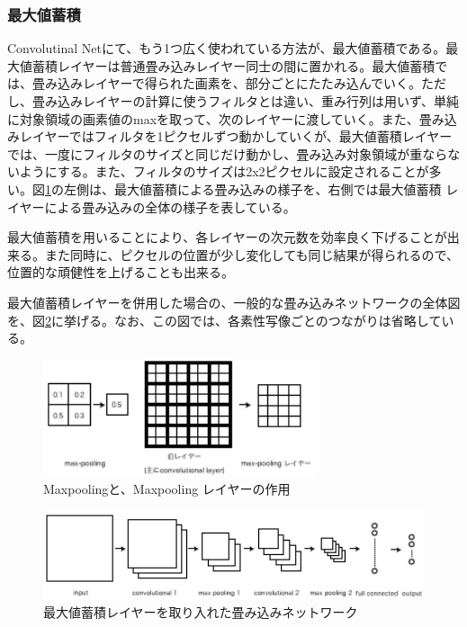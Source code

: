 \subsubsection{最大値蓄積}
Convolutinal Netにて、もう1つ広く使われている方法が、最大値蓄積である。最大値蓄積レイヤーは普通畳み込みレイヤー同士の間に置かれる。最大値蓄積では、畳み込みレイヤーで得られた画素を、部分ごとにたたみ込んでいく。ただし、畳み込みレイヤーの計算に使うフィルタとは違い、重み行列は用いず、単純に対象領域の画素値のmaxを取って、次のレイヤーに渡していく。また、畳み込みレイヤーではフィルタを1ピクセルずつ動かしていくが、最大値蓄積レイヤーでは、一度にフィルタのサイズと同じだけ動かし、畳み込み対象領域が重ならないようにする。また、フィルタのサイズは2x2ピクセルに設定されることが多い。図\ref{c3_maxpooling}の左側は、最大値蓄積による畳み込みの様子を、右側では最大値蓄積 レイヤーによる畳み込みの全体の様子を表している。\par
最大値蓄積を用いることにより、各レイヤーの次元数を効率良く下げることが出来る。また同時に、ピクセルの位置が少し変化しても同じ結果が得られるので、位置的な頑健性を上げることも出来る。\par
最大値蓄積レイヤーを併用した場合の、一般的な畳み込みネットワークの全体図を、図\ref{c3_convnet}に挙げる。なお、この図では、各素性写像ごとのつながりは省略している。

\begin{figure}[tbp]
 \centering
  \includegraphics[width=80mm]{img/c3/maxpooling}
 \caption{Maxpoolingと、Maxpooling レイヤーの作用}
 \label{c3_maxpooling}
\end{figure}

\begin{figure}[tbp]
 \centering
  \includegraphics[width=120mm]{img/c3/convnet}
 \caption{最大値蓄積レイヤーを取り入れた畳み込みネットワーク}
 \label{c3_convnet}
\end{figure}

